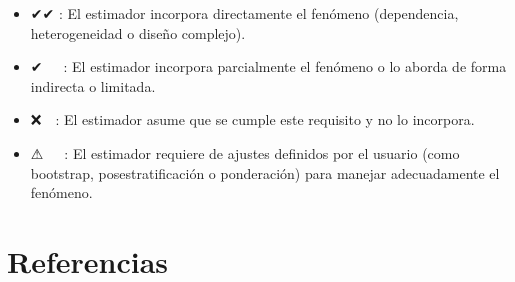 \documentclass[
  12pt,
]{book}
\providecommand{\tightlist}{%
  \setlength{\itemsep}{0pt}\setlength{\parskip}{0pt}}
\begin{document}
\begin{itemize}
\tightlist
\item
  ✔✔ : El estimador incorpora directamente el fenómeno (dependencia, heterogeneidad o diseño complejo).
\item
  ✔~~~: El estimador incorpora parcialmente el fenómeno o lo aborda de forma indirecta o limitada.
\item
  ❌~~: El estimador asume que se cumple este requisito y no lo incorpora.
\item
  ⚠~~~: El estimador requiere de ajustes definidos por el usuario (como bootstrap, posestratificación o ponderación) para manejar adecuadamente el fenómeno.
\end{itemize}

\chapter{Referencias}\label{referencias}


\end{document}
